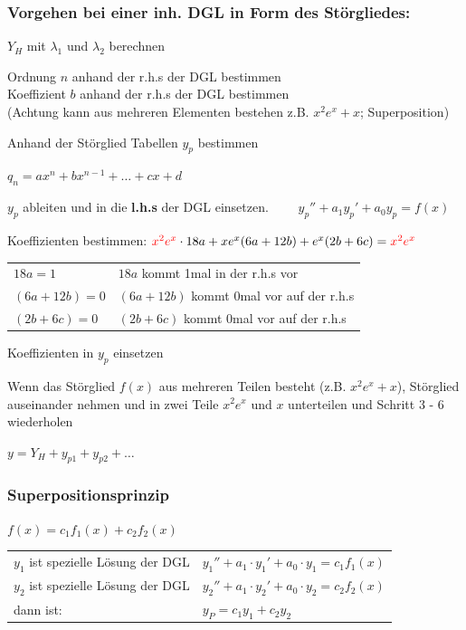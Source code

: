 \subsubsection{Vorgehen bei einer inh. DGL in Form des Störgliedes: }
	\begin{compactenum}
		\item 	$Y_H$ mit $\lambda_1$ und $\lambda_2$ berechnen
		\item 	Ordnung $n$ anhand der r.h.s der DGL bestimmen\\
			Koeffizient $b$ anhand der r.h.s der DGL bestimmen\\
			(Achtung kann aus mehreren Elementen bestehen z.B. $x^2e^x + x$; Superposition)
		\item 	Anhand der Störglied Tabellen $y_p$ bestimmen
		\item 	$q_n = ax^n + bx^{n-1} + \dots + cx + d$
		\item 	$y_p$ ableiten und in die \textbf{ l.h.s} der DGL einsetzen. $\qquad y_p'' + a_1 y_p' + a_0y_p = f(x)$
		\item 	Koeffizienten bestimmen: $\textcolor{red}{x^2e^x}\cdot 18a + xe^x(6a + 12b) + e^x(2b + 6c) = \textcolor{red}{x^2e^x}$\\
			\begin{tabular}{ll}
				$18a = 1$ & $18a$ kommt 1mal in der r.h.s vor\\
				$(6a + 12b) = 0$ & $(6a + 12b)$ kommt 0mal vor auf der r.h.s\\
				$(2b + 6c) = 0$ & $(2b + 6c)$ kommt 0mal vor auf der r.h.s
			\end{tabular}
		\item 	Koeffizienten in $y_p$ einsetzen
		\item 	Wenn das Störglied $f(x)$ aus mehreren Teilen besteht (z.B. $x^2e^x + x$), Störglied auseinander nehmen und in zwei Teile $x^2e^x$ und $x$ unterteilen und Schritt 3 - 6 wiederholen
		\item 	$y = Y_H + y_{p1} + y_{p2} + \dots$

	\end{compactenum}


\subsubsection{Superpositionsprinzip}
$f(x)=c_1f_1(x)+c_2f_2(x)$\\
\begin{tabular}{p{8cm}p{8cm}}
$y_1$ ist spezielle Lösung der DGL &
$y_1''+a_1\cdot y_1'+a_0\cdot y_1=c_1f_1(x)$ \\
$y_2$ ist spezielle Lösung der DGL &
$y_2''+a_1\cdot y_2'+a_0\cdot y_2=c_2f_2(x)$ \\
dann ist:                          &
$y_P=c_1y_1+c_2y_2$\\
\end{tabular}

